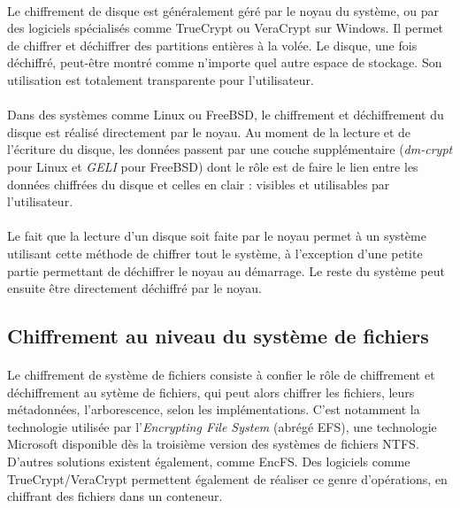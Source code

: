 \paragraph{}
Le chiffrement de disque est généralement géré par le noyau du système, ou par
des logiciels spécialisés comme TrueCrypt ou VeraCrypt sur Windows. Il permet de
chiffrer et déchiffrer des partitions entières à la volée. Le disque, une fois
déchiffré, peut-être montré comme n'importe quel autre espace de stockage. Son
utilisation est totalement transparente pour l'utilisateur.
\paragraph{}
Dans des systèmes comme Linux ou FreeBSD, le chiffrement et déchiffrement du
disque est réalisé directement par le noyau. Au moment de la lecture et de
l'écriture du disque, les données passent par une couche supplémentaire
(\textit{dm-crypt} pour Linux et \textit{GELI}\cite{manGeli} pour FreeBSD) dont
le rôle est de faire le lien entre les données chiffrées du disque et celles en
clair : visibles et utilisables par l'utilisateur.
\paragraph{}
Le fait que la lecture d'un disque soit faite par le noyau permet à un système
utilisant cette méthode de chiffrer tout le système, à l'exception d'une petite
partie permettant de déchiffrer le noyau au démarrage. Le reste du système peut
ensuite être directement déchiffré par le noyau.

\subsection{Chiffrement au niveau du système de fichiers}
\paragraph{}
Le chiffrement de système de fichiers consiste à confier le rôle de chiffrement
et déchiffrement au sytème de fichiers, qui peut alors chiffrer les fichiers, 
leurs métadonnées, l'arborescence, selon les implémentations. 
C'est notamment la technologie utilisée par l'\textit{Encrypting File System}
(abrégé EFS), une technologie Microsoft disponible dès la troisième version 
des systèmes de fichiers NTFS. 
D'autres solutions existent également, comme EncFS. Des logiciels
comme TrueCrypt/VeraCrypt permettent également de réaliser ce genre
d'opérations, en chiffrant des fichiers dans un conteneur.
